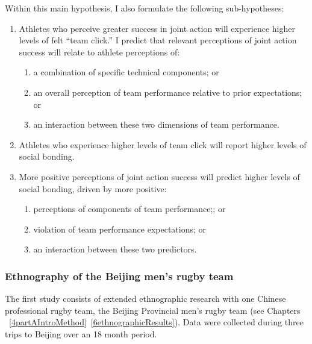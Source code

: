 \begin{CJK}{UTF8}{gbsn}
    Within this main hypothesis, I also formulate the following sub-hypotheses:
    \begin{enumerate}
      \item Athletes who perceive greater success in joint action will experience higher levels of felt ``team click.'' I predict that relevant perceptions of joint action success will relate to athlete perceptions of:
        \begin{enumerate}
          \item a combination of specific technical components; or
          \item an overall perception of team performance relative to prior expectations; or
          \item an interaction between these two dimensions of team performance.
        \end{enumerate}
      \item Athletes who experience higher levels of team click will report higher levels of social bonding.
      \item More positive perceptions of joint action success will predict higher levels of social bonding, driven by more positive:
      \begin{enumerate}
        \item perceptions of components of team performance;; or
        \item violation of team performance expectations; or
        \item an interaction between these two predictors.
      \end{enumerate}
    \end{enumerate}









\subsubsection{Ethnography of the Beijing men's rugby team}
  The first study consists of extended ethnographic research with one Chinese professional rugby team, the Beijing Provincial men's rugby team (see Chapters ~\ref{4partAIntroMethod}\nobreakdash~\ref{6ethnographicResults}).  Data were collected during three trips to Beijing over an 18 month period.


\end{CJK}
